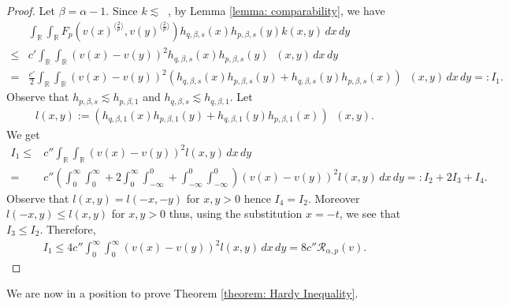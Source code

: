 \documentclass[12pt, a4paper]{amsart}
\DeclareMathOperator{\Mass}{\nu_{\alpha}}
\newcommand{\R}{\mathbb{R}}
\newcommand{\RR}{\mathcal{R}}
\begin{document}
\begin{proof}Let $\beta = \alpha - 1$. Since $k \lesssim \Mass$, by Lemma \cref{lemma: comparability}, we have
\begin{align*}
    &\int_{\R}\int_{\R}F_p \left(v(x)^{\langle \frac{2}{p} \rangle}, v(y)^{\langle \frac{2}{p} \rangle}\right) h_{q, \beta, s}(x)h_{p, \beta, s}(y) k(x, y)\,dx\,dy
    \\
    \leq &c'\int_{\R}\int_{\R}(v(x) - v(y))^2 h_{q, \beta, s}(x)h_{p, \beta, s}(y) \Mass(x, y)\,dx\,dy
    \\
    = &\frac{c'}{2}\int_{\R}\int_{\R}(v(x) - v(y))^2 (h_{q, \beta, s}(x)h_{p, \beta, s}(y) + h_{q, \beta, s}(y)h_{p, \beta, s}(x)) \Mass(x, y)\,dx\,dy =: I_1.
\end{align*}
Observe that $h_{p, \beta, s} \lesssim h_{p, \beta, 1}$ and $h_{q, \beta, s} \lesssim h_{q, \beta, 1}$. Let 
\begin{align*}
    l(x, y) := (h_{q, \beta, 1}(x)h_{p, \beta, 1}(y) + h_{q, \beta, 1}(y)h_{p, \beta, 1}(x)) \Mass(x, y).
\end{align*}
We get
\begin{align*}
        I_1 \leq & c''\int_{\R}\int_{\R}(v(x) - v(y))^2l(x, y)\,dx\,dy
        \\
        = & c''\left(\int_{0}^{\infty}\int_{0}^{\infty} + 2\int_{0}^{\infty}\int_{-\infty}^{0}+ \int_{-\infty}^{0}\int_{-\infty}^{0}  \right)(v(x) - v(y))^2 l(x, y)\,dx\,dy =: I_2+2I_3+I_4.
\end{align*}
Observe that $l(x, y) = l(-x, -y)$ for $x, y > 0$ hence $I_4=I_2$. Moreover $l(-x, y) \leq l(x, y)$ for $x, y > 0$ thus, using the substitution $x = -t$, we see that $I_3\le I_2$.
Therefore,
\begin{align*}
    I_1 \leq 4 c''\int_{0}^{\infty}\int_{0}^{\infty}(v(x) - v(y))^2 l(x, y)\,dx\,dy = 8c'' \RR_{\alpha, p}(v).
\end{align*}
\end{proof}

We are now in a position to prove Theorem \cref{theorem: Hardy Inequality}.
\end{document}
